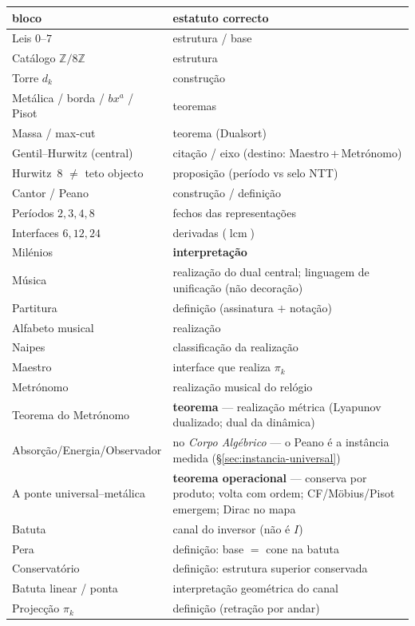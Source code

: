 \documentclass[11pt,a4paper]{article}
\begin{document}
\begin{center}\small
\begin{tabular}{@{}ll@{}}
bloco & estatuto correcto \\
\hline
Leis $0$--$7$ & estrutura / base \\
Catálogo $\mathbb{Z}/8\mathbb{Z}$ & estrutura \\
Torre $d_k$ & construção \\
Metálica / borda / $bx^{a}$ / Pisot & teoremas \\
Massa / max-cut & teorema (Dualsort) \\
Gentil--Hurwitz (central) & citação / eixo (destino: Maestro\,+\,Metrónomo) \\
Hurwitz~$8$ $\neq$ teto objecto & proposição (período vs selo NTT) \\
Cantor / Peano & construção / definição \\
Períodos $2,3,4,8$ & fechos das representações \\
Interfaces $6,12,24$ & derivadas ($\operatorname{lcm}$) \\
Milénios & \textbf{interpretação} \\
Música & realização do dual central; linguagem de unificação (não decoração) \\
Partitura & definição (assinatura $+$ notação) \\
Alfabeto musical & realização \\
Naipes & classificação da realização \\
Maestro & interface que realiza $\pi_k$ \\
Metrónomo & realização musical do relógio \\
Teorema do Metrónomo & \textbf{teorema} --- realização métrica
  (Lyapunov dualizado; dual da dinâmica) \\
Absorção/Energia/Observador & no \emph{Corpo Algébrico} --- o Peano
  é a instância medida (\S\ref{sec:instancia-universal}) \\
A ponte universal--metálica & \textbf{teorema operacional} --- conserva por
  produto; volta com ordem; CF/Möbius/Pisot emergem; Dirac no mapa \\
Batuta & canal do inversor (não é $I$) \\
Pera & definição: base $=$ cone na batuta \\
Conservatório & definição: estrutura superior conservada \\
Batuta linear / ponta & interpretação geométrica do canal \\
Projecção $\pi_k$ & definição (retração por andar) \\

\end{tabular}
\end{center}
\end{document}
